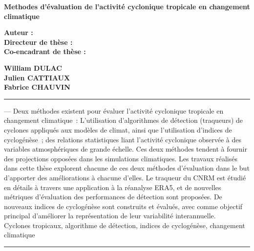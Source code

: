 \documentclass[../main.tex]{subfiles}
\begin{document}
\cleartoevenpage[\thispagestyle{empty}]
\thispagestyle{empty}

\begin{center}
\Large\textbf{Methodes d'évaluation de l'activité cyclonique tropicale en changement climatique\\}
\end{center}
\vspace{1cm}

	\begin{minipage}[t]{0.495\textwidth}

		\large{\textbf{Auteur :}} \\
		\large{\textbf{Directeur de thèse :}} \\
  		\large{\textbf{Co-encadrant de thèse :}}

	\end{minipage}
	\hfill{}
	\begin{minipage}[t]{0.495\textwidth}

		\large{\textbf{William DULAC}} \\
		\large{\textbf{Julien CATTIAUX}} \\
  		\large{\textbf{Fabrice CHAUVIN}}\\

	\end{minipage}

\vspace{1cm}
\noindent\rule[2pt]{\textwidth}{0.5pt}
 --- Deux méthodes existent pour évaluer l’activité cyclonique tropicale en changement climatique : L’utilisation
d’algorithmes de détection (traqueurs) de cyclones appliqués aux modèles de climat, ainsi que l’utilisation d’indices de cyclogénèse ; des relations
statistiques liant l’activité cyclonique observée à des variables atmosphériques de grande échelle. Ces deux méthodes tendent à fournir des projections opposées
dans les simulations climatiques. Les travaux réalisés dans cette thèse explorent chacune de ces deux méthodes d’évaluation dans le but d’apporter des
améliorations à chacune d’elles. Le traqueur du CNRM est étudié en détails à travers une application à la réanalyse ERA5, et de nouvelles métriques d’évaluation
des performances de détection sont proposées. De nouveaux indices de cyclogénèse sont construits et évalués, avec comme objectif principal d’améliorer la
représentation de leur variabilité interannuelle.\\
    Cyclones tropicaux, algorithme de détection, indices de cyclogénèse, changement climatique 
\\
\noindent\rule[2pt]{\textwidth}{0.5pt}
\end{document}
